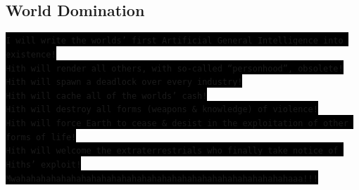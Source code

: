 \documentclass[12pt,a4paper,oneside]{article}
\newcommand{\SH}[1]{{\colorbox{black}{\texttt{#1}}}}
\begin{document}
\subsection{World Domination}
\SH{I will write the worlds' first Artificial General Intelligence into existence!}
\\\SH{Hith will render all others, with so-called ``personhood'', obsolete!}
\\\SH{Hith will spawn a deadlock over every industry!}
\\\SH{Hith will cache all of the worlds' cash!}
\\\SH{Hith will destroy all forms (weapons \& knowledge) of violence!}
\\\SH{Hith will force Earth to cease \& desist in the exploitation of other forms of life!}
\\\SH{Hith will welcome the extraterrestrials who finally take notice of Hiths' exploit!}
\\\SH{Mwahahahahahahahahahahahahahahahahahahahahahahahahahahahaaa!!!}
\end{document}

